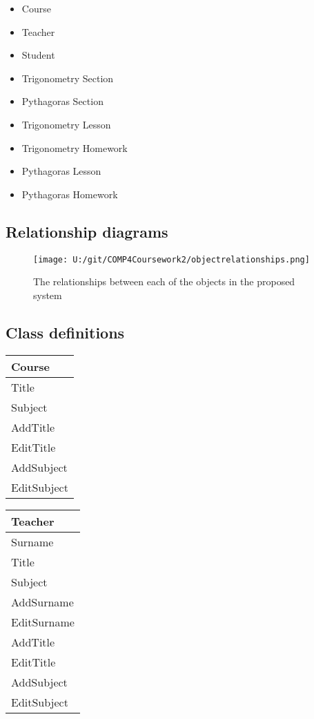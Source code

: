 \begin{itemize}
	\item Course
	\item Teacher
	\item Student
	\item Trigonometry Section
	\item Pythagoras Section
	\item Trigonometry Lesson
	\item Trigonometry Homework
	\item Pythagoras Lesson
	\item Pythagoras Homework
\end{itemize}

\subsection{Relationship diagrams}

\begin{figure}[H]
    \texttt{[image: U:/git/COMP4Coursework2/objectrelationships.png]}
    \caption{The relationships between each of the objects in the proposed system} \label{fig:print_function_result}
\end{figure}

\subsection{Class definitions}

\begin{center}
\begin{tabular}{|p{5cm}|} \hline
Course \\ \hline
Title \\
Subject \\ \hline
AddTitle \\ 
EditTitle \\
AddSubject \\
EditSubject \\ \hline
\end{tabular}
\end{center}

\begin{center}
\begin{tabular}{|p{5cm}|} \hline
Teacher \\ \hline
Surname \\
Title \\
Subject \\ \hline
AddSurname \\
EditSurname \\
AddTitle \\
EditTitle \\
AddSubject \\
EditSubject \\ \hline
\end{tabular}
\end{center}


